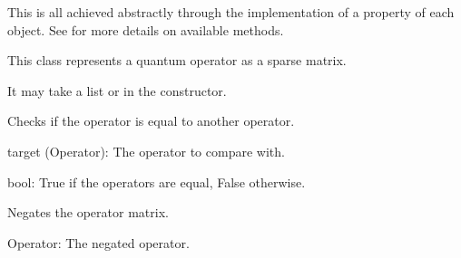\documentclass[letterpaper,10pt,english]{sphinxmanual}
\begin{document}
\sphinxAtStartPar
This is all achieved abstractly through the implementation of a  property of each 
object. See  for more details on available methods.

\begin{fulllineitems}
\label{\detokenize{index:utils.tensor.Operator}}
\pysigstartsignatures
{}
\pysigstopsignatures
\sphinxAtStartPar
This class represents a quantum operator as a sparse matrix.

\sphinxAtStartPar
It may take a list or  in the constructor.

\begin{fulllineitems}
\label{\detokenize{index:utils.tensor.Operator.equal}}
\pysigstartsignatures
{}
\pysigstopsignatures
\sphinxAtStartPar
Checks if the operator is equal to another operator.
\begin{description}
\sphinxAtStartPar
target (Operator): The operator to compare with.

\sphinxAtStartPar
bool: True if the operators are equal, False otherwise.

\end{description}

\end{fulllineitems}


\begin{fulllineitems}
\label{\detokenize{index:utils.tensor.Operator.negate}}
\pysigstartsignatures
{}
\pysigstopsignatures
\sphinxAtStartPar
Negates the operator matrix.
\begin{description}
\sphinxAtStartPar
Operator: The negated operator.


\end{description}
\end{fulllineitems}
\end{fulllineitems}
\end{document}
